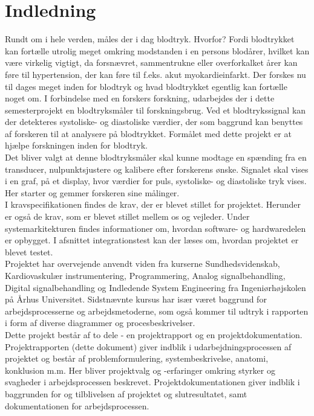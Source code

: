 \chapter{Indledning} 
Rundt om i hele verden, måles der i dag blodtryk. Hvorfor? Fordi blodtrykket kan fortælle utrolig meget omkring modstanden i en persons blodårer, hvilket kan være virkelig vigtigt, da forsnævret, sammentrukne eller overforkalket årer kan føre til hypertension, der kan føre til f.eks. akut myokardieinfarkt. Der forskes nu til dages meget inden for blodtryk og hvad blodtrykket egentlig kan fortælle noget om. I forbindelse med en forskers forskning, udarbejdes der i dette semesterprojekt en blodtryksmåler til forskningsbrug. Ved et blodtrykssignal kan der detekteres systoliske- og diastoliske værdier, der som baggrund kan benyttes af forskeren til at analysere på blodtrykket. Formålet med dette projekt er at hjælpe forskningen inden for blodtryk. \\
Det bliver valgt at denne blodtryksmåler skal kunne modtage en spænding fra en transducer, nulpunktsjustere og kalibere efter forskerens ønske. Signalet skal vises i en graf, på et display, hvor værdier for puls, systoliske- og diastoliske tryk vises. Her starter og gemmer forskeren sine målinger. \\
I kravspecifikationen findes de krav, der er blevet stillet for projektet. Herunder er også de krav, som er blevet stillet mellem os og vejleder. Under systemarkitekturen findes informationer om, hvordan software- og hardwaredelen er opbygget.  I afsnittet integrationstest kan der læses om, hvordan projektet er blevet testet. \\
Projektet har overvejende anvendt viden fra kurserne Sundhedsvidenskab, Kardiovaskulær instrumentering, Programmering, Analog signalbehandling, Digital signalbehandling og Indledende System Engineering fra Ingeniørhøjskolen på Århus Universitet. Sidstnævnte kursus har især været baggrund for arbejdsprocesserne og arbejdsmetoderne, som også kommer til udtryk i rapporten i form af diverse diagrammer og procesbeskrivelser. \\
Dette projekt består af to dele - en projektrapport og en projektdokumentation. Projektrapporten (dette dokument) giver indblik i udarbejdningsprocessen af projektet og består af problemformulering, systembeskrivelse, anatomi, konklusion m.m. Her bliver projektvalg og -erfaringer omkring styrker og svagheder i arbejdsprocessen beskrevet. Projektdokumentationen giver indblik i baggrunden for og tilblivelsen af projektet og slutresultatet, samt dokumentationen for arbejdsprocessen. \\

